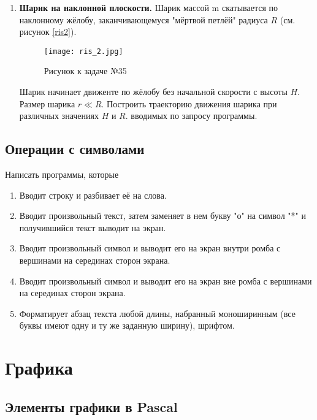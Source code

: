 \begin{enumerate}
  \item {\bf Шарик на наклонной плоскости.}
Шарик массой m скатывается по наклонному жёлобу, заканчивающемуся "мёртвой петлёй" радиуса $R$ (см. рисунок \ref{ris2}). 
\begin{figure}[!hb]
\centerline{
\texttt{[image: ris\_2.jpg]}}
\caption{Рисунок к задаче №35}
\label{ris3}
\end{figure}
Шарик начинает движенте по жёлобу без начальной скорости с высоты $H$. Размер шарика $r \ll R$. Построить траекторию движения шарика при различных значениях $H$ и $R$. вводимых по запросу программы.

\end{enumerate}

\subsection{Операции с символами}

Написать программы, которые

\begin{enumerate}
  \item Вводит строку и разбивает её на слова.

  \item Вводит произвольный текст, затем заменяет в нем букву "о" на   символ "*" и получившийся текст выводит на экран.

  \item Вводит произвольный символ и выводит его на экран внутри ромба с вершинами на серединах сторон экрана.

  \item Вводит произвольный символ и выводит его на экран вне ромба с вершинами на серединах сторон экрана.

  \item Форматирует абзац текста любой длины, набранный моноширинным (все буквы имеют одну и ту же заданную ширину), шрифтом.
\end{enumerate}

\section{Графика}

\subsection{Элементы графики в Pascal}

